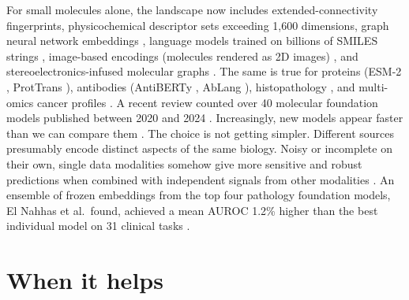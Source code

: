 {%
For small molecules alone, the landscape now includes extended-connectivity fingerprints, physicochemical descriptor sets exceeding 1,600 dimensions, graph neural network embeddings \citep{Yang2019, Fang2022}, language models trained on billions of SMILES strings \citep{ross2022}, image-based encodings (molecules rendered as 2D images) \citep{Zeng2022}, and stereoelectronics-infused molecular graphs \citep{Boiko2025}. The same is true for proteins (ESM-2 \citep{Lin2023}, ProtTrans \citep{Elnaggar2022}), antibodies (AntiBERTy \citep{Ruffolo2021AntiBERTy}, AbLang \citep{Olsen2022}), histopathology \citep{ElNahhas2025}, and multi-omics cancer profiles \citep{Steyaert2023}. A recent review counted over 40 molecular foundation models published between 2020 and 2024 \citep{Song2026}. Increasingly, new models appear faster than we can compare them \citep{Bommasani2021}. The choice is not getting simpler. Different sources presumably encode distinct aspects of the same biology. Noisy or incomplete on their own, single data modalities somehow give more sensitive and robust predictions when combined with independent signals from other modalities \citep{Steyaert2023}. An ensemble of frozen embeddings from the top four pathology foundation models, El Nahhas et al.\ found, achieved a mean AUROC 1.2\% higher than the best individual model on 31 clinical tasks \citep{ElNahhas2025}.


\section{When it helps}

}
